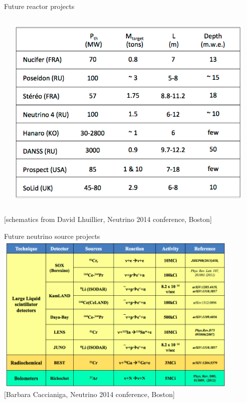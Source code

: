 \begin{frame}[t]{Future reactor projects}
\begin{columns}[t]
\begin{column}{0.50\textwidth}
  \end{column}
  \begin{column}{0.50\textwidth}
     \includegraphics[width=0.95\textwidth]{./images/beyond3nu/future/vsbn_reactor_tab2.png}
  \end{column}
\end{columns}
{\scriptsize \color{blue}[schematics from David Lhuillier, Neutrino 2014 conference, Boston]}
\end{frame}


\begin{frame}[t]{Future neutrino source projects}
\centering
\includegraphics[width=0.88\textwidth]{./images/beyond3nu/future/hot_source_tab.png}\\
{\scriptsize \color{blue}[Barbara Caccianiga, Neutrino 2014 conference, Boston]}

\end{frame}



